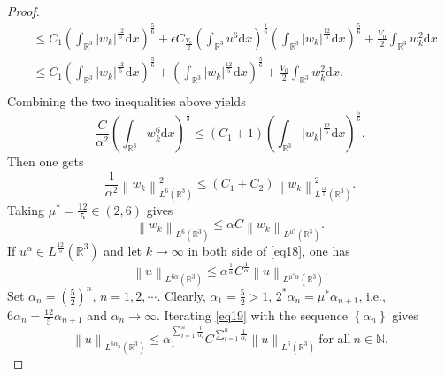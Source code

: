 \documentclass[12pt]{amsart}
\numberwithin{equation}{section}
\theoremstyle{definition}
\begin{document}
\begin{proof}
\begin{equation*}
\begin{aligned}
				&\leq C_{1}\left ( \int_{\mathbb{R}^{3}}\left|w_{k} \right|^{\frac{12}{5}} \text{d}x\right )^{\frac{5}{6}}+\epsilon C_{\frac{V_0}{2}}\left ( \int_{\mathbb{R}^{3}} u^{6}\text{d}x \right )^{\frac{1}{6}} \left ( \int_{\mathbb{R}^{3}}|w_{k}|^{ \frac{12}{5}}\text{d}x\right )^{\frac{5}{6}}+\frac{V_0}{2} \int_{\mathbb{R}^{3}}w_{k}^{2}\text{d}x\\
				&\leq C_{1}\left ( \int_{\mathbb{R}^{3}}\left|w_{k} \right|^{\frac{12}{5}} \text{d}x\right )^{\frac{5}{6}}+\left ( \int_{\mathbb{R}^{3}}\left|w_{k} \right| ^{\frac{12}{5}}\text{d}x\right )^{\frac{5}{6}}+\frac{V_0}{2} \int_{\mathbb{R}^{3}} w_{k}^{2}\text{d}x.\\
			\end{aligned}
		\end{equation*}
		Combining the two inequalities above yields
		\begin{equation*}
			\frac{C}{\alpha ^{2}}\left ( \int_{\mathbb{R}^{3}}w_{k}  ^{6}\text{d}x\right )^{\frac{1}{3}}\leq (C_{1}+1)\left ( \int_{\mathbb{R}^{3}}\left|w_{k} \right|^{\frac{12}{5}} \text{d}x\right )^{\frac{5}{6}}.
		\end{equation*}
		Then one gets $$\frac{1}{\alpha ^{2}} \left\|w_{k} \right\|_{L^{6}(\mathbb{R}^3)}^{2}\leq \left ( C_{1} +C_{2}\right )\left\|w_{k} \right\|_{L^{\frac{12}{5}}(\mathbb{R}^3)}^{2}.$$
		Taking $\mu ^{*}=\frac{12}{5}\in \left ( 2,6 \right )$ gives
		\begin{equation} \label{eq18}
			\left\|w_{k} \right\|_{L^{6}(\mathbb{R}^3)}\leq \alpha  C \left\| w_{k}\right\|_{L^{\mu^{\ast}}(\mathbb{R}^3)}.
		\end{equation}
		If $u^{\alpha }\in L^{\frac{12}{5}}\left ( \mathbb{R}^{3} \right )$ and let $k\to \infty$ in both side of \eqref{eq18}, one has
		\begin{equation} \label{eq19}
			\left\|u \right\|_{L^{6 \alpha}(\mathbb{R}^3) }\leq \alpha ^{\frac{1}{\alpha }} C^{\frac{1}{\alpha }} \left\|u \right\|_{L^{\mu^{\ast} \alpha}(\mathbb{R}^3) }.
		\end{equation}
		Set $\alpha _{n}=\left ( \frac{5}{2} \right )^{n}$, $n=1,2,\cdots$. Clearly, $\alpha _{1}= \frac{5}{2}>1$, $2^{*}\alpha _{n}=\mu ^{*}\alpha _{n+1}$, i.e., $6 \alpha_{n}=\frac{12}{5}\alpha _{n+1}$ and $\alpha _{n}\to \infty$. Iterating  \eqref{eq19} with the sequence $\left\{ \alpha _{n}\right\}$ gives
		\begin{equation} \label{eq20}
			\left\|u \right\|_{L^{6 \alpha _{n}}(\mathbb{R}^3)}\leq \alpha _{1}^{\sum_{i=1}^{n}\frac{i}{\alpha _{i}}}C^{\sum_{i=1}^{n}\frac{1}{\alpha _{i}}} \left\|u \right\|_{L^{6}(\mathbb{R}^3)}~\text{for~all}~n\in \mathbb{N}.

\end{equation}
\end{proof}
\end{document}
